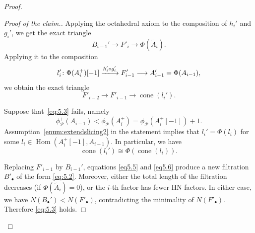 \documentclass[11pt, reqno]{amsart}
\numberwithin{equation}{section}
\theoremstyle{plain}
\theoremstyle{remark}
\theoremstyle{definition}
\theoremstyle{italicsname}
\DeclareMathOperator{\Hom}{Hom}
\DeclareMathOperator{\cone}{cone}
\newcommand{\cP}{\mathscr{P}}
\begin{document}
\begin{proof}
\begin{proof}[Proof of the claim.]
Applying the octahedral axiom to the composition of $h_i'$ and $g_i'$, we get the exact triangle
\begin{equation}\label{eq5.5}
B_{i-1}'\longrightarrow F'_i\longrightarrow\Phi(\widetilde{A}_i).
\end{equation}
Applying it to the composition
\[
l'_i\colon\Phi(A_i^+)[-1]\xlongrightarrow{h'_i\circ g'_i}F'_{i-1}\longrightarrow A'_{i-1}=\Phi(A_{i-1}),
\]
we obtain the exact triangle
\begin{equation}\label{eq5.6}
F'_{i-2}\longrightarrow F'_{i-1}\longrightarrow \cone(l_i').
\end{equation}

Suppose that~\eqref{eq:5.3} fails, namely
\[
\phi^+_\cP(A_{i-1})<\phi_\cP(A^+_i)=\phi_\cP(A^+_i[-1])+1.
\]
Assumption~\ref{enum:extendslicing2} in the statement implies that $l_i'=\Phi(l_i)$ for some $l_i\in\Hom(A^+_i[-1],A_{i-1})$. 
In particular, we have
\[
\cone(l_i')\cong\Phi(\cone(l_i)).
\]

Replacing $F'_{i-1}$ by $B_{i-1}'$, equations \eqref{eq5.5} and \eqref{eq5.6} produce a new filtration $B'_\bullet$ of the form \eqref{eq:5.2}.
Moreover, either the total length of the filtration decreases (if $\Phi(\widetilde{A}_i)=0$), or the $i$-th factor has fewer HN factors.
In either case, we have $N(B_\bullet')<N(F'_\bullet)$, contradicting the minimality of $N(F'_\bullet)$. 
Therefore \eqref{eq:5.3} holds.
\end{proof}


\end{proof}
\end{document}
